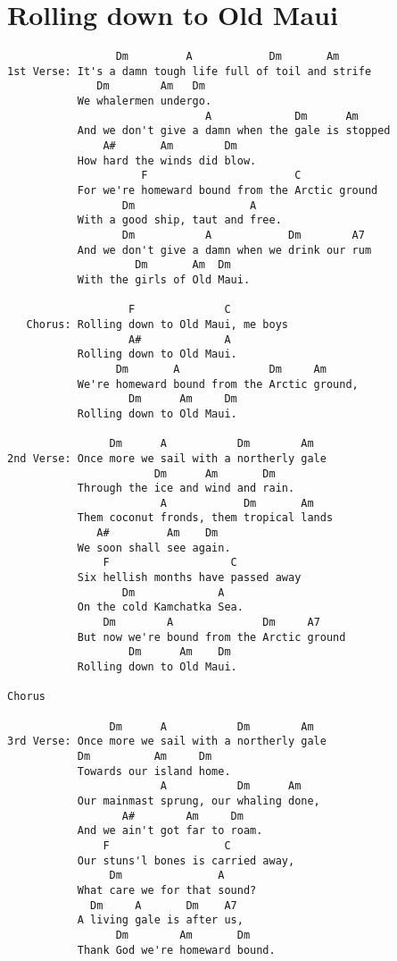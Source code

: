 \documentclass[leqno]{memoir}
\begin{document}
\chapter{Rolling down to Old Maui}
\begin{verbatim}
                 Dm         A            Dm       Am
1st Verse: It's a damn tough life full of toil and strife
              Dm        Am   Dm
           We whalermen undergo.
                               A             Dm      Am
           And we don't give a damn when the gale is stopped
               A#       Am        Dm
           How hard the winds did blow.
                     F                       C
           For we're homeward bound from the Arctic ground
                  Dm                  A
           With a good ship, taut and free.
                  Dm           A            Dm        A7
           And we don't give a damn when we drink our rum
                    Dm       Am  Dm
           With the girls of Old Maui.

                   F              C
   Chorus: Rolling down to Old Maui, me boys
                   A#             A
           Rolling down to Old Maui.
                 Dm       A              Dm     Am
           We're homeward bound from the Arctic ground,
                   Dm      Am     Dm
           Rolling down to Old Maui.

                Dm      A           Dm        Am
2nd Verse: Once more we sail with a northerly gale
                       Dm      Am       Dm
           Through the ice and wind and rain.
                        A            Dm       Am
           Them coconut fronds, them tropical lands
              A#         Am    Dm
           We soon shall see again.
               F                   C
           Six hellish months have passed away
                  Dm             A
           On the cold Kamchatka Sea.
               Dm        A              Dm     A7
           But now we're bound from the Arctic ground
                   Dm      Am    Dm
           Rolling down to Old Maui.

Chorus

                Dm      A           Dm        Am
3rd Verse: Once more we sail with a northerly gale
           Dm          Am     Dm
           Towards our island home.
                        A           Dm      Am
           Our mainmast sprung, our whaling done,
                  A#        Am     Dm
           And we ain't got far to roam.
               F                  C
           Our stuns'l bones is carried away,
                Dm               A
           What care we for that sound?
             Dm     A       Dm    A7
           A living gale is after us,
                 Dm        Am       Dm
           Thank God we're homeward bound.


\end{verbatim}
\end{document}
